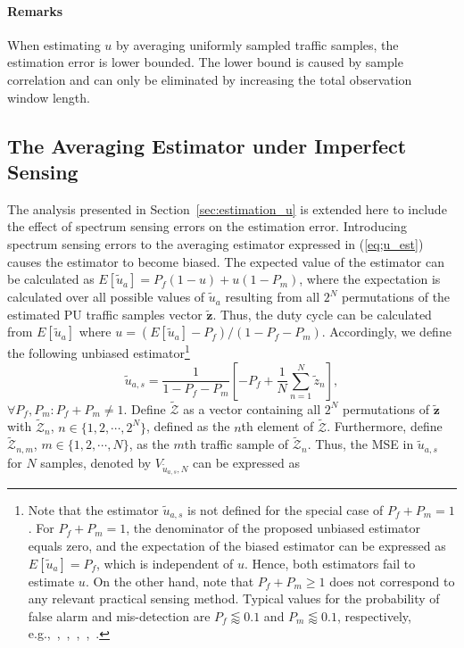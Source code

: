\documentclass[11pt,draftclsnofoot,journal,onecolumn]{IEEEtran}
\begin{document}
\paragraph*{Remarks}

When estimating $u$ by averaging uniformly sampled traffic samples, the estimation error is lower bounded. The lower bound is caused by sample correlation and can only be eliminated by increasing the total observation window length.

\subsection{The Averaging Estimator under Imperfect Sensing}
\label{sec:estimation_u_err}

The analysis presented in Section~\ref{sec:estimation_u} is extended here to include the effect of spectrum sensing errors on the estimation error. Introducing spectrum sensing errors to the averaging estimator expressed in (\ref{eq;u_est}) causes the estimator to become biased. The expected value of the estimator can be calculated as $E\left[\tilde{u}_a\right] = P_f\left(1 - u\right) + u\left(1 - P_m\right)$, where the expectation is calculated over all possible values of $\tilde{u}_a$ resulting from all $2^N$ permutations of the estimated PU traffic samples vector $\boldsymbol{\tilde z}$. Thus, the duty cycle can be calculated from $E\left[\tilde{u}_a\right]$ where $u = (E\left[\tilde{u}_a\right]-P_f)/(1-P_f-P_m)$. Accordingly, we define the following unbiased estimator\footnote{Note that the estimator $\tilde{u}_{a,s}$ is not defined for the special case of $P_f + P_m = 1$. For $P_f + P_m = 1$, the denominator of the proposed unbiased estimator equals zero, and the expectation of the biased estimator can be expressed as $E\left[\tilde{u}_a\right] = P_f$, which is independent of $u$. Hence, both estimators fail to estimate $u$. On the other hand, note that $P_f+P_m\geq1$ does not correspond to any relevant practical sensing method. Typical values for the probability of false alarm and mis-detection are $P_f\lessapprox0.1$ and $P_m\lessapprox0.1$, respectively, e.g.,~\cite[Sec. VII-C]{arslan_tutorial},~\cite[Sec. VI-A]{tian_twc_2012},~\cite{Gerihofer_commag_2007,stevenson_commag_2009},~\cite[Sec. 6.6]{min_tmc_2011},~\cite[Sec. IV-A]{kim_twc_2010}.}
\begin{equation}
\tilde{u}_{a,s} = \frac{1}{1-P_f-P_m}\left[-P_f + \frac{1}{N} \sum_{n=1}^{N} \tilde{z}_n\right],
\label{eq;u_est_1}
\end{equation}
$\forall P_f, P_m: P_f+P_m\neq1$. Define $\mathcal{\tilde Z}$ as a vector containing all $2^N$ permutations of $\boldsymbol{\tilde z}$ with $\mathcal{\tilde Z}_n$, $n \in \{1,2,\cdots,2^N\}$, defined as the $n$th element of $\mathcal{\tilde Z}$. Furthermore, define $\mathcal{\tilde Z}_{n,m}$, $m \in \{1,2,\cdots,N\}$, as the $m$th traffic sample of $\mathcal{\tilde Z}_n$. Thus, the MSE in $\tilde{u}_{a,s}$ for $N$ samples, denoted by $V_{\tilde{u}_{a,s},N}$ can be expressed as
\end{document}
